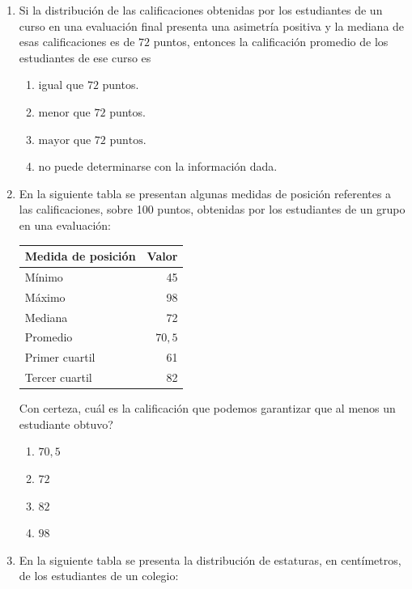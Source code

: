 \documentclass[11pt]{article}
\newcommand{\opcion}[2]{\item $#2$}
\begin{document}
\begin{enumerate}[label=\textbf{\arabic*.}, itemsep=2.5cm]
\Needspace{0.30\textheight}
\item
Si la distribuci\'on de las calificaciones obtenidas por los estudiantes de un curso en una evaluaci\'on final presenta una asimetr\'ia positiva y la mediana de esas calificaciones es de $72$ puntos, entonces la calificaci\'on promedio de los estudiantes de ese curso es

\begin{enumerate}[label=\Alph*)]
  \item igual que $72$ puntos.
  \item menor que $72$ puntos.
  \opcion{C}{\text{mayor que }72\text{ puntos.}}
  \item no puede determinarse con la informaci\'on dada.
\end{enumerate}

\Needspace{0.52\textheight}
\item
En la siguiente tabla se presentan algunas medidas de posici\'on referentes a las calificaciones, sobre 100 puntos, obtenidas por los estudiantes de un grupo en una evaluaci\'on:

\begin{center}
\renewcommand{\arraystretch}{1.2}
\begin{tabular}{|l|r|}
\hline
\textbf{Medida de posici\'on} & \textbf{Valor} \\
\hline
M\'inimo & 45 \\
M\'aximo & 98 \\
Mediana & 72 \\
Promedio & $70{,}5$ \\
Primer cuartil & 61 \\
Tercer cuartil & 82 \\
\hline
\end{tabular}
\end{center}

Con certeza, \textquestiondown cu\'al es la calificaci\'on que podemos garantizar que al menos un estudiante obtuvo?

\begin{enumerate}[label=\Alph*)]
  \item $70{,}5$
  \item $72$
  \item $82$
  \opcion{D}{98}
\end{enumerate}

\Needspace{0.55\textheight}
\item
En la siguiente tabla se presenta la distribuci\'on de estaturas, en cent\'imetros, de los estudiantes de un colegio:


\end{enumerate}
\end{document}
